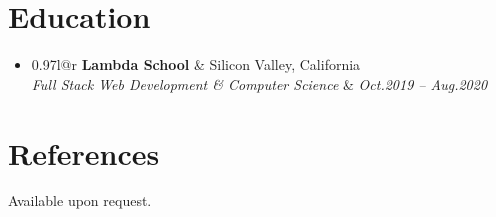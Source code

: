\documentclass[letterpaper,12pt]{article}
\makeatletter
\newcommand{\resumeSubheading}[4]{
  \vspace{-1pt}\item{
    \begin{tabular*}{0.97\textwidth}{l@{\extracolsep{\fill}}r}
      \textbf{#1} & #2 \\
      \textit{\small#3} & \textit{\small #4} \\
    \end{tabular*}\vspace{-5pt}}
}
\newcommand{\resumeSubHeadingListStart}{\begin{itemize}[leftmargin=*]}
\newcommand{\resumeSubHeadingListEnd}{\end{itemize}}
\makeatother
\begin{document}
  \section{Education}
  \resumeSubHeadingListStart
  \resumeSubheading
  {Lambda School}{Silicon Valley, California}
  {Full Stack Web Development & Computer Science}{Oct.2019 -- Aug.2020}
  \resumeSubHeadingListEnd

  \section{References}
  Available upon request.

\end{document}
